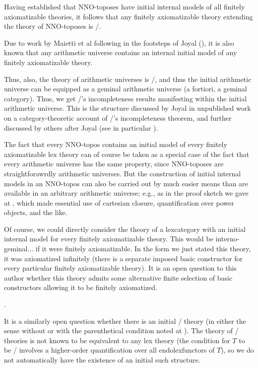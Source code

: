 Having established that NNO-toposes have initial internal models of all finitely axiomatizable theories, it follows that any finitely axiomatizable theory extending the theory of NNO-toposes is \initogeminal/.

Due to work by Maietti et al following in the footsteps of Joyal (), it is also known that any arithmetic universe contains an internal initial model of any finitely axiomatizable theory.

Thus, also, the theory of arithmetic universes is \initogeminal/, and thus the initial arithmetic universe can be equipped as a geminal arithmetic universe (a fortiori, a geminal category). Thus, we get \Godel/'s incompleteness results manifesting within the initial arithmetic universe. This is the structure discussed by Joyal in unpublished work on a category-theoretic account of \Godel/'s incompleteness theorem, and further discussed by others after Joyal (see in particular \autocite{van2020g}).

The fact that every NNO-topos contains an initial model of every finitely axiomatizable lex theory can of course be taken as a special case of the fact that every arithmetic universe has the same property, since NNO-toposes are straightforawrdly arithmetic universes. But the construction of initial internal models in an NNO-topos can also be carried out by much easier means than are available in an arbitrary arithmetic universe; e.g., as in the proof sketch we gave at , which made essential use of cartesian closure, quantification over power objects, and the like.

Of course, we could directly consider the theory of a lexcategory with an initial internal model for every finitely axiomatizable theory. This would be interno-geminal... if it were finitely axiomatizable. In the form we just stated this theory, it was axiomatized infinitely (there is a separate imposed basic constructor for every particular finitely axiomatizable theory). It is an open question to this author whether this theory admits some alternative finite selection of basic constructors allowing it to be finitely axiomatized.

.

It is a similarly open question whether there is an initial \initogeminal/ theory (in either the sense without or with the parenthetical condition noted at ). The theory of \initogeminal/ theories is not known to be equivalent to any lex theory (the condition for $T$ to be \initogeminal/ involves a higher-order quantification over all endolexfunctors of $T$), so we do not automatically have the existence of an initial such structure.

